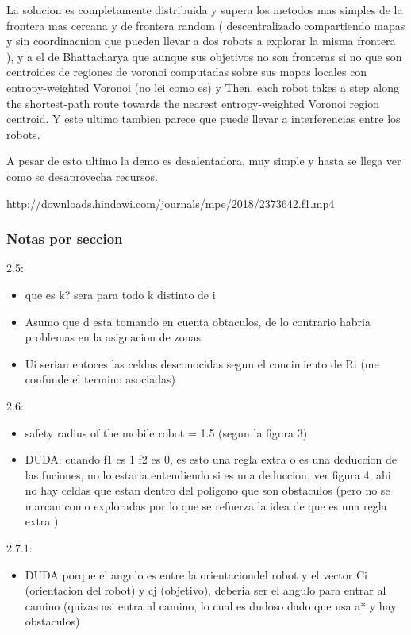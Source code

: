 La solucion es completamente distribuida y supera los metodos mas simples de la frontera mas cercana y de frontera random ( descentralizado compartiendo mapas y sin coordinacnion que pueden llevar a dos robots a explorar la misma frontera ), y a el de Bhattacharya que aunque sus objetivos no son fronteras si no que son centroides de regiones de voronoi computadas sobre sus mapas locales con entropy-weighted Voronoi (no lei como es) y Then, each robot takes a step along the shortest-path route towards the nearest entropy-weighted Voronoi region centroid. Y este ultimo tambien parece que puede llevar a interferencias entre los robots.

A pesar de esto ultimo la demo es desalentadora, muy simple y hasta se llega ver como se desaprovecha recursos.

http://downloads.hindawi.com/journals/mpe/2018/2373642.f1.mp4

\subsubsection{Notas por seccion}
2.5:
\begin{itemize}
  \item que es k? sera para todo k distinto de i
  \item  Asumo que d esta tomando en cuenta obtaculos, de lo contrario habria problemas en la asignacion de zonas
  \item  Ui serian entoces las celdas desconocidas segun el concimiento de Ri (me confunde el termino asociadas)
\end{itemize}

2.6:
\begin{itemize}
  \item safety radius of the mobile robot = 1.5 (segun la figura 3)
  \item DUDA: cuando f1 es 1 f2 es 0, es esto una regla extra o es una deduccion de las fuciones, no lo estaria entendiendo si es una deduccion, ver figura 4, ahi no hay celdas que estan dentro del poligono que son obstaculos (pero no se marcan como exploradas por lo que se refuerza la idea de que es una regla extra )
\end{itemize}

2.7.1:
\begin{itemize}
\item DUDA porque el angulo es entre la orientaciondel robot y el vector Ci (orientacion del robot) y cj (objetivo), deberia ser el angulo para entrar al camino (quizas asi entra al camino, lo cual es dudoso dado que usa a* y hay obstaculos)
\end{itemize}

